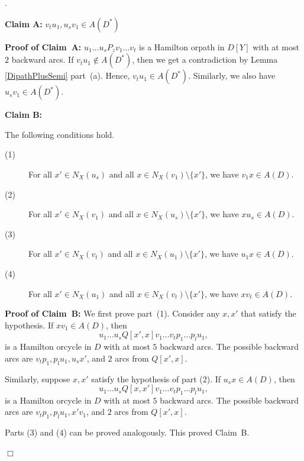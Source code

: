 \documentclass{article}
\newcommand{\2}{\vspace{2mm}}
\renewenvironment{proof}[1][]{\par \noindent {\bf Proof#1}.\ }{\hfill$\Box$
\par \vspace{11pt}}
\theoremstyle{definition}
\begin{document}
\begin{proof}
\2

{\bf Claim A:} {$v_tu_1,u_sv_1 \in A(D^*)$}

\2

{\bf Proof of Claim~A:}
$u_1 \dots u_sP_zv_1 \dots v_t$ is a Hamilton orpath in $D[Y]$ with at most $2$ backward arcs. If $v_tu_1 \notin A(D^*)$, then we get a contradiction by Lemma \ref{DipathPlusSemi} part~(a). Hence, $v_tu_1 \in A(D^*)$.
Similarly, we also have $u_sv_1 \in A(D^*)$.

\2

{\bf Claim B:} {The following conditions hold.
\begin{description}
\item[(1)] For all $x' \in N_X(u_s)$ and all $x \in N_X(v_1)\setminus \{x'\}$, we have $v_1x \in A(D)$.

\item[(2)] For all $x' \in N_X(v_1)$ and all $x \in N_X(u_s)\setminus \{x'\}$, we have $xu_s \in A(D)$.

\item[(3)] For all $x' \in N_X(v_t)$ and all $x \in N_X(u_1)\setminus \{x'\}$, we have $u_1x \in A(D)$.

\item[(4)] For all $x' \in N_X(u_1)$ and all $x \in N_X(v_t)\setminus \{x'\}$, we have $xv_t \in A(D)$.
\end{description}
}

\2
{\bf Proof of Claim~B:}
We first prove part~(1). 
Consider any $x, x'$ that satisfy the hypothesis. If $xv_1  \in A(D)$, then
\[
u_1 \dots u_sQ[x',x]v_1 \dots v_t p_1\dots p_lu_1,
\]
is a Hamilton orcycle in $D$ with at most $5$ backward arcs.
The possible backward arcs are $v_tp_1,p_lu_1,u_sx'$, and $2$ arcs from $Q[x',x]$.

Similarly, suppose $x, x'$ satisfy the hypothesis of part (2).
If $u_sx  \in A(D)$, then
\[
u_1 \dots u_sQ[x,x']v_1 \dots v_t p_1\dots p_lu_1,
\]
is a Hamilton orcycle in $D$ with at most $5$ backward arcs.
The possible backward arcs are $v_tp_1,p_lu_1,x'v_1$, and $2$ arcs from $Q[x',x]$.

Parts (3) and (4) can be proved analogously. This proved Claim~B.



\end{proof}
\end{document}
